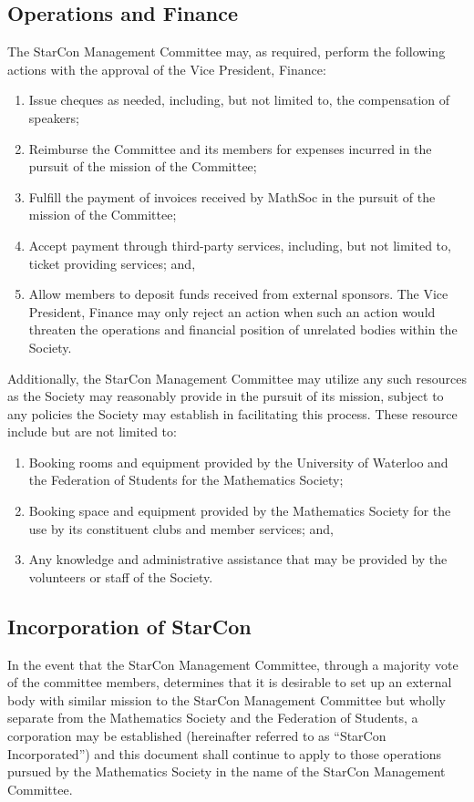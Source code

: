 \subsection{Operations and Finance}
The StarCon Management Committee may, as required, perform the following actions with the approval of the Vice President, Finance:
\begin{enumerate}
\item Issue cheques as needed, including, but not limited to, the compensation of speakers;
\item Reimburse the Committee and its members for expenses incurred in the pursuit of the mission of the Committee;
\item Fulfill the payment of invoices received by MathSoc in the pursuit of the mission of the Committee;
\item Accept payment through third-party services, including, but not limited to, ticket providing services; and,
\item Allow members to deposit funds received from external sponsors.
The Vice President, Finance may only reject an action when such an action would threaten the operations and financial position of unrelated bodies within the Society.
\end{enumerate}

Additionally, the StarCon Management Committee may utilize any such resources as the Society may reasonably provide in the pursuit of its mission, subject to any policies the Society may establish in facilitating this process. These resource include but are not limited to:

\begin{enumerate}
\item Booking rooms and equipment provided by the University of Waterloo and the
Federation of Students for the Mathematics Society;
\item Booking space and equipment provided by the Mathematics Society for the use by its constituent clubs and member services; and,
\item Any knowledge and administrative assistance that may be provided by the volunteers or staff of the Society.
\end{enumerate}

\subsection{Incorporation of StarCon}
In the event that the StarCon Management Committee, through a majority vote of the committee members, determines that it is desirable to set up an external body with similar mission to the StarCon Management Committee but wholly separate from the Mathematics Society and the Federation of Students, a corporation may be established (hereinafter referred to as ``StarCon Incorporated'') and this document shall continue to apply to those operations pursued by the Mathematics Society in the name of the StarCon Management Committee.

